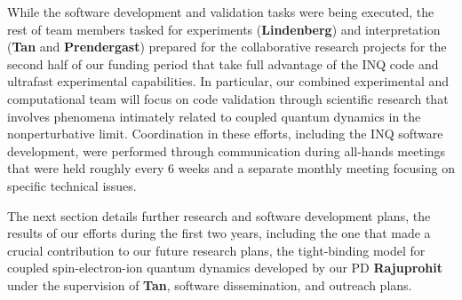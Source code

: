  While the software development and validation tasks were being executed, the rest of team members tasked for experiments ({\bf Lindenberg}) and interpretation ({\bf Tan} and {\bf Prendergast}) prepared for the collaborative research projects for the second half of our funding period that take full advantage of the INQ code and ultrafast experimental capabilities. In particular, our combined experimental and computational team will focus on code validation through scientific research that involves phenomena intimately related to coupled quantum dynamics in the nonperturbative limit. Coordination in these efforts, including the INQ software development, were performed through communication during all-hands meetings that were held roughly every 6 weeks and a separate monthly meeting focusing on specific technical issues.
 
 The next section details further research and software development plans, the results of our efforts during the first two years, including the one that made a crucial contribution to our future research plans, the tight-binding model for coupled spin-electron-ion quantum dynamics developed by our PD {\bf Rajuprohit} under the supervision of {\bf Tan}, software dissemination, and outreach plans.
 

\clearpage
